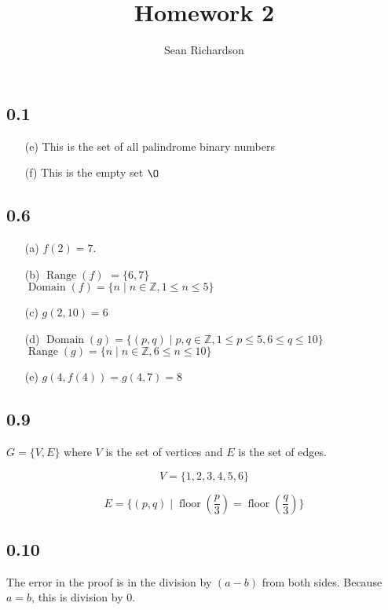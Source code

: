 \documentclass{article}
\title{Homework 2}
\author{Sean Richardson}
\DeclareMathOperator{\floor}{floor}
\DeclareMathOperator{\range}{Range}
\DeclareMathOperator{\domain}{Domain}
\begin{document}
\maketitle

\subsection*{0.1}

\begin{itemize}
    \item[(e)] This is the set of all palindrome binary numbers
    \item[(f)] This is the empty set $\O$
\end{itemize}

\subsection*{0.6}

\begin{itemize}
    \item[(a)] $f(2) = 7$.
    \item[(b)] $\range(f)$ $ = \{ 6, 7 \}$ \\
    $\domain(f) = \{ n \mid n \in \mathbb{Z}, 1 \leq n \leq 5 \}$ 
    \item[(c)] $g(2,10) = 6$
    \item[(d)] $\domain(g) = \{ (p,q) \mid p,q \in \mathbb{Z}, 1 \leq p
        \leq 5, 6 \leq q \leq 10 \}$\\
        $\range(g) = \{ n \mid n \in \mathbb{Z}, 6 \leq n \leq 10 \}$
    \item[(e)] $g(4, f(4)) = g(4,7) = 8$
\end{itemize}

\subsection*{0.9}

$G = \{ V, E \}$ where $V$ is the set of vertices and $E$ is the set of
edges.

$$V = \{ 1, 2, 3, 4, 5, 6 \}$$

$$E = \{ (p,q) \mid \floor \left( \frac{p}{3} \right) = \floor \left(
    \frac{q}{3} \right) \}$$

\subsection*{0.10}

    The error in the proof is in the division by $(a-b)$ from both sides.
    Because $a=b$, this is division by $0$.
\end{document}
